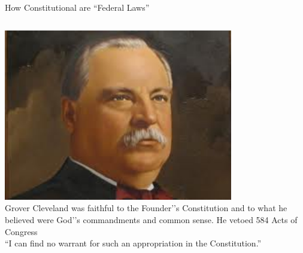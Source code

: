 \begin{frame}{How Constitutional are ``Federal Laws''}
    \begin{columns}[onlytextwidth]
            \centering
            \includegraphics[width=0.75\textwidth]{img/cleveland2.png} \\

            Grover Cleveland was faithful to the Founder'’s Constitution and to
            what he believed were God'’s commandments and common sense.  He
            vetoed 584 Acts of Congress \\
            \pause
            \vspace{15pt}
            ``I can find no warrant for such an appropriation in the Constitution.'' \\

    \end{columns}
\end{frame}

% 
% 

